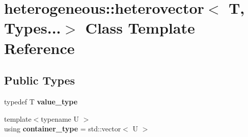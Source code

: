 \hypertarget{classheterogeneous_1_1heterovector_3_01_t_00_01_types_8_8_8_4}{}\section{heterogeneous\+:\+:heterovector$<$ T, Types...$>$ Class Template Reference}
\label{classheterogeneous_1_1heterovector_3_01_t_00_01_types_8_8_8_4}
\subsection*{Public Types}
\begin{DoxyCompactItemize}
\item 
\hypertarget{classheterogeneous_1_1heterovector_3_01_t_00_01_types_8_8_8_4_abf9ad0ac1aa66267587bd9ea22c9b0e4}{}typedef T {\bfseries value\+\_\+type}\label{classheterogeneous_1_1heterovector_3_01_t_00_01_types_8_8_8_4_abf9ad0ac1aa66267587bd9ea22c9b0e4}

\item 
\hypertarget{classheterogeneous_1_1heterovector_3_01_t_00_01_types_8_8_8_4_a9128a43cf67f58907157ad0fff7d06ef}{}{\footnotesize template$<$typename U $>$ }\\using {\bfseries container\+\_\+type} = std\+::vector$<$ U $>$\label{classheterogeneous_1_1heterovector_3_01_t_00_01_types_8_8_8_4_a9128a43cf67f58907157ad0fff7d06ef}

\end{DoxyCompactItemize}
